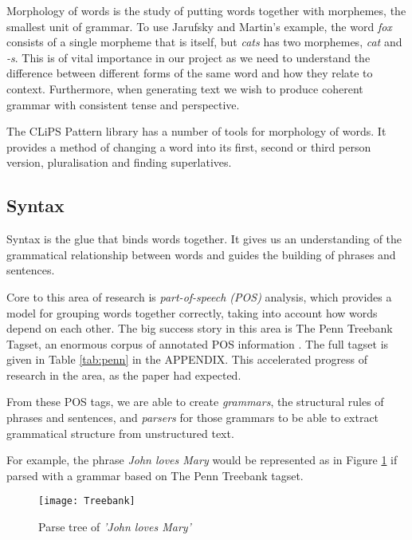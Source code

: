 Morphology of words is the study of putting words together with morphemes, the smallest unit of grammar. To use Jarufsky and Martin's example, the word \textit{fox} consists of a single morpheme that is itself, but \textit{cats} has two morphemes, \textit{cat} and \textit{-s}. This is of vital importance in our project as we need to understand the difference between different forms of the same word and how they relate to context. Furthermore, when generating text we wish to produce coherent grammar with consistent tense and perspective.

The CLiPS Pattern library has a number of tools for morphology of words. It provides a method of changing a word into its first, second or third person version, pluralisation and finding superlatives.\cite{de2012pattern}


\subsection{Syntax}
\label{sec:syntax}
Syntax is the glue that binds words together. It gives us an understanding of the grammatical relationship between words and guides the building of phrases and sentences.

Core to this area of research is \textit{part-of-speech (POS)} analysis, which provides a model for grouping words together correctly, taking into account how words depend on each other. The big success story in this area is The Penn Treebank Tagset, an enormous corpus of annotated POS information \cite{marcus1993building}. The full tagset is given in Table \ref{tab:penn} in the APPENDIX. This accelerated progress of research in the area, as the paper had expected. 

From these POS tags, we are able to create \textit{grammars}, the structural rules of phrases and sentences, and \textit{parsers} for those grammars to be able to extract grammatical structure from unstructured text.

For example, the phrase \textit{John loves Mary} would be represented as in Figure \ref{fig:parse} if parsed with a grammar based on The Penn Treebank tagset.

\begin{figure}[h!]
\centering
\texttt{[image: Treebank]}
\caption{Parse tree of \textit{'John loves Mary'}}
\label{fig:parse}
\end{figure}

